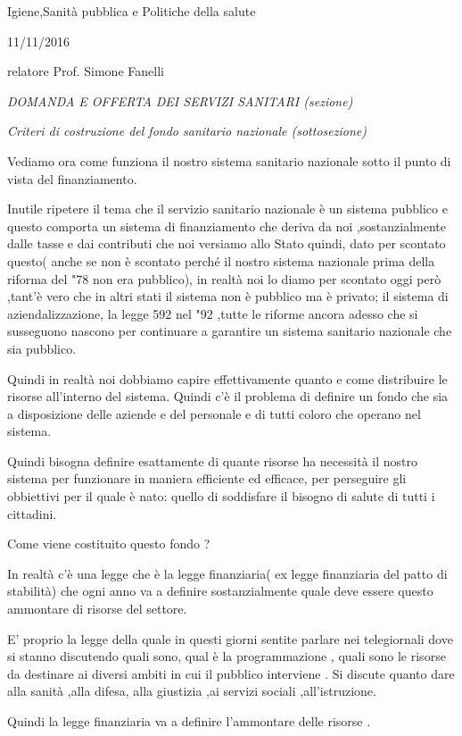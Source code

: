 \documentclass[]{article}
\date{}
\begin{document}
Igiene,Sanità pubblica e Politiche della salute

11/11/2016

relatore Prof. Simone Fanelli

\emph{DOMANDA E OFFERTA DEI SERVIZI SANITARI (sezione)}

\emph{Criteri di costruzione del fondo sanitario nazionale
(sottosezione)}

Vediamo ora come funziona il nostro sistema sanitario nazionale sotto il
punto di vista del finanziamento.

Inutile ripetere il tema che il servizio sanitario nazionale è un
sistema pubblico e questo comporta un sistema di finanziamento che
deriva da noi ,sostanzialmente dalle tasse e dai contributi che noi
versiamo allo Stato quindi, dato per scontato questo( anche se non è
scontato perché il nostro sistema nazionale prima della riforma del "78
non era pubblico), in realtà noi lo diamo per scontato oggi però ,tant'è
vero che in altri stati il sistema non è pubblico ma è privato; il
sistema di aziendalizzazione, la legge 592 nel "92 ,tutte le riforme
ancora adesso che si susseguono nascono per continuare a garantire un
sistema sanitario nazionale che sia pubblico.

Quindi in realtà noi dobbiamo capire effettivamente quanto e come
distribuire le risorse all'interno del sistema. Quindi c'è il problema
di definire un fondo che sia a disposizione delle aziende e del
personale e di tutti coloro che operano nel sistema.

Quindi bisogna definire esattamente di quante risorse ha necessità il
nostro sistema per funzionare in maniera efficiente ed efficace, per
perseguire gli obbiettivi per il quale è nato: quello di soddisfare il
bisogno di salute di tutti i cittadini.

Come viene costituito questo fondo ?

In realtà c'è una legge che è la legge finanziaria( ex legge finanziaria
del patto di stabilità) che ogni anno va a definire sostanzialmente
quale deve essere questo ammontare di risorse del settore.

E' proprio la legge della quale in questi giorni sentite parlare nei
telegiornali dove si stanno discutendo quali sono, qual è la
programmazione , quali sono le risorse da destinare ai diversi ambiti in
cui il pubblico interviene . Si discute quanto dare alla sanità ,alla
difesa, alla giustizia ,ai servizi sociali ,all'istruzione.

Quindi la legge finanziaria va a definire l'ammontare delle risorse .
\end{document}
